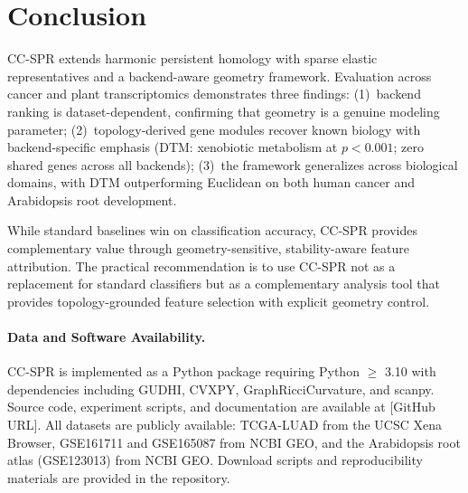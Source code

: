\documentclass[11pt]{article}
\begin{document}
\section{Conclusion}
\label{sec:conclusion}

CC-SPR extends harmonic persistent homology with sparse elastic representatives and a backend-aware geometry framework.
Evaluation across cancer and plant transcriptomics demonstrates three findings:
(1)~backend ranking is dataset-dependent, confirming that geometry is a genuine modeling parameter;
(2)~topology-derived gene modules recover known biology with backend-specific emphasis (DTM: xenobiotic metabolism at $p < 0.001$; zero shared genes across all backends);
(3)~the framework generalizes across biological domains, with DTM outperforming Euclidean on both human cancer and Arabidopsis root development.

While standard baselines win on classification accuracy, CC-SPR provides complementary value through geometry-sensitive, stability-aware feature attribution.
The practical recommendation is to use CC-SPR not as a replacement for standard classifiers but as a complementary analysis tool that provides topology-grounded feature selection with explicit geometry control.

\paragraph{Data and Software Availability.}
CC-SPR is implemented as a Python package requiring Python $\geq$ 3.10 with dependencies including GUDHI, CVXPY, GraphRicciCurvature, and scanpy.
Source code, experiment scripts, and documentation are available at [GitHub URL].
All datasets are publicly available: TCGA-LUAD from the UCSC Xena Browser, GSE161711 and GSE165087 from NCBI GEO, and the Arabidopsis root atlas (GSE123013) from NCBI GEO.
Download scripts and reproducibility materials are provided in the repository.
\end{document}
